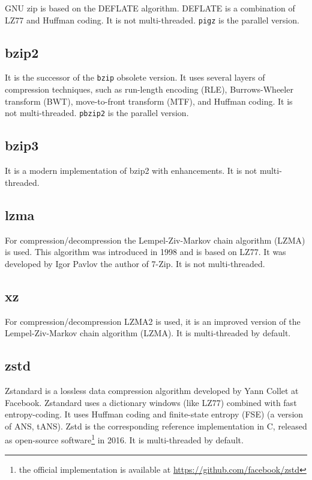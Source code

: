 \documentclass[12pt, a4paper]{report}
\begin{document}
GNU zip is based on the DEFLATE algorithm.
DEFLATE is a combination of LZ77 and Huffman coding.
It is not multi-threaded.
\texttt{pigz} is the parallel version.

\subsection{bzip2}
\label{subsec:bzip2}

It is the successor of the \texttt{bzip} obsolete version.
It uses several layers of compression techniques, such as run-length encoding (RLE), Burrows-Wheeler transform (BWT),
move-to-front transform (MTF), and Huffman coding.
It is not multi-threaded.
\texttt{pbzip2} is the parallel version.

\subsection{bzip3}
\label{subsec:bzip3}

It is a modern implementation of bzip2 with enhancements.
It is not multi-threaded.

\subsection{lzma}
\label{subsec:lzma}

For compression/decompression the Lempel-Ziv-Markov chain algorithm (LZMA) is used.
This algorithm was introduced in 1998 and is based on LZ77.
It was developed by Igor Pavlov the author of 7-Zip.
It is not multi-threaded.

\subsection{xz}
\label{subsec:xz}

For compression/decompression LZMA2 is used, it is an improved version of the Lempel-Ziv-Markov chain algorithm (LZMA).
It is multi-threaded by default.

\subsection{zstd}
\label{subsec:zstd}

Zstandard is a lossless data compression algorithm developed by Yann Collet at Facebook.
Zstandard uses a dictionary windows (like LZ77) combined with fast entropy-coding.
It uses Huffman coding and finite-state entropy (FSE) (a version of ANS, tANS).
Zstd is the corresponding reference implementation in C, released as open-source software\footnote{the official implementation is
available at \url{https://github.com/facebook/zstd}} in 2016.
It is multi-threaded by default.
\end{document}
